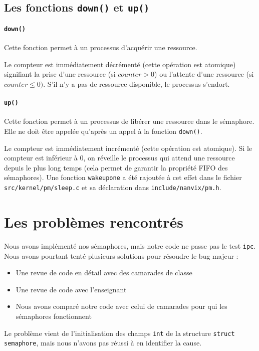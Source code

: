 \documentclass[a4paper,11pt,french]{article}
\begin{document}
\subsection{Les fonctions \texttt{down()} et \texttt{up()}}

\paragraph{\texttt{down()}}

Cette fonction permet à un processus d'acquérir une ressource.

Le compteur est immédiatement décrémenté (cette opération est atomique) signifiant la prise d'une ressource (si $counter > 0$) ou l'attente d'une ressource (si $counter \leq 0)$.
S'il n'y a pas de ressource disponible, le processus s'endort.

\paragraph{\texttt{up()}}

Cette fonction permet à un processus de libérer une ressource dans le sémaphore. Elle ne doit être appelée qu'après un appel à la fonction \texttt{down()}.

Le compteur est immédiatement incrémenté (cette opération est atomique).
Si le compteur est inférieur à 0, on réveille le processus qui attend une ressource depuis le plus long temps (cela permet de garantir la propriété FIFO des sémaphores).
Une fonction \texttt{wakeupone} a été rajoutée à cet effet dans le fichier \texttt{src/kernel/pm/sleep.c} et sa déclaration dans \texttt{include/nanvix/pm.h}.

\section{Les problèmes rencontrés}

Nous avons implémenté nos sémaphores, mais notre code ne passe pas le test \texttt{ipc}.
Nous avons pourtant tenté plusieurs solutions pour résoudre le bug majeur :

\begin{itemize}
	\item Une revue de code en détail avec des camarades de classe 
	\item Une revue de code avec l'enseignant
	\item Nous avons comparé notre code avec celui de camarades pour qui les sémaphores fonctionnent
\end{itemize}

Le problème vient de l'initialisation des champs \texttt{int} de la structure \texttt{struct semaphore}, mais nous n'avons pas réussi à en identifier la cause.
\end{document}
